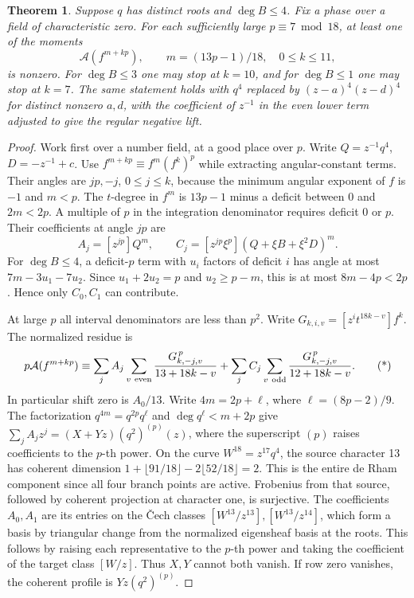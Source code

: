 \documentclass[11pt]{article}
\newtheorem{theorem}{Theorem}
\newcommand{\A}{\mathcal A}
\begin{document}
\begin{theorem}\label{thm:moving-branch}
Suppose \(q\) has distinct roots and \(\deg B\le4\).
Fix a phase over a field of characteristic zero. For each
sufficiently large \(p\equiv7\bmod18\), at least one of the moments
\[
       \A(f^{m+kp}),\qquad m=(13p-1)/18,\quad 0\le k\le11,
\]
is nonzero. For \(\deg B\le3\) one may stop at \(k=10\), and
for \(\deg B\le1\) one may stop at \(k=7\).
The same statement holds with \(q^4\) replaced by
\((z-a)^4(z-d)^4\) for distinct nonzero \(a,d\), with the
coefficient of \(z^{-1}\) in the even lower term adjusted to
give the regular negative lift.
\end{theorem}

\begin{proof}
Work first over a number field, at a good place over \(p\).
Write \(Q=z^{-1}q^4\), \(D=-z^{-1}+c\). Use
\(f^{m+kp}\equiv f^m(f^k)^p\) while extracting angular-constant
terms. Their angles are \(jp,-j\), \(0\le j\le k\), because the
minimum angular exponent of \(f\) is \(-1\) and \(m<p\).
The \(t\)-degree in \(f^m\) is \(13p-1\) minus a deficit
between 0 and \(2m<2p\). A multiple of \(p\) in the integration
denominator requires deficit 0 or \(p\). Their coefficients at
angle \(jp\) are
\[
  A_j=[z^{jp}]Q^m,\qquad
  C_j=[z^{jp}\xi^p](Q+\xi B+\xi^2 D)^m .
\]
For \(\deg B\le4\), a deficit-\(p\) term with \(u_i\) factors of
deficit \(i\) has angle at most \(7m-3u_1-7u_2\).
Since \(u_1+2u_2=p\) and \(u_2\ge p-m\), this is at most
\(8m-4p<2p\). Hence only \(C_0,C_1\) can contribute.

At large \(p\) all interval denominators are less than \(p^2\).
Write \(G_{k,i,v}=[z^it^{18k-v}]f^k\). The normalized residue is
\[
 p\A(f^{m+kp})\equiv
 \sum_j A_j\sum_{v\ {\rm even}}\frac{G_{k,-j,v}^{\,p}}{13+18k-v}
 +\sum_j C_j\sum_{v\ {\rm odd}}\frac{G_{k,-j,v}^{\,p}}{12+18k-v}.
 \tag{*}
\]
In particular shift zero is \(A_0/13\).
Write \(4m=2p+\ell\), where \(\ell=(8p-2)/9\).
The factorization \(q^{4m}=q^{2p}q^\ell\) and
\(\deg q^\ell<m+2p\) give
\(\sum_j A_jz^j=(X+Yz)(q^2)^{(p)}(z)\), where the superscript
\((p)\) raises coefficients to the \(p\)-th power.
On the curve \(W^{18}=z^{17}q^4\), the source character 13
has coherent dimension \(1+\lfloor91/18\rfloor-
2\lfloor52/18\rfloor=2\). This is the entire de Rham component
since all four branch points are active. Frobenius from that
source, followed by coherent projection at character one, is
surjective. The coefficients \(A_0,A_1\) are its entries on the
\v{C}ech classes \([W^{13}/z^{13}],[W^{13}/z^{14}]\), which
form a basis by triangular change from the normalized
eigensheaf basis at the roots. This follows by raising each
representative to the \(p\)-th power and taking the coefficient
of the target class \([W/z]\). Thus \(X,Y\) cannot both vanish.
If row zero vanishes, the coherent profile is
\(Yz(q^2)^{(p)}\).


\end{proof}
\end{document}
